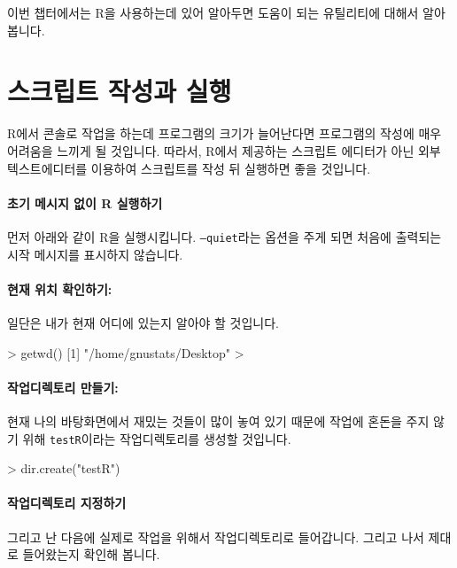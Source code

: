 이번 챕터에서는 R을 사용하는데 있어 알아두면 도움이 되는 유틸리티에 대해서 알아봅니다.


\section{스크립트 작성과 실행}

R에서 콘솔로 작업을 하는데 프로그램의 크기가 늘어난다면 프로그램의 작성에 매우 어려움을 느끼게 될 것입니다.
따라서, R에서 제공하는 스크립트 에디터가 아닌 외부 텍스트에디터를 이용하여 스크립트를 작성 뒤 실행하면 좋을 것입니다.

\paragraph{초기 메시지 없이 R 실행하기}
먼저 아래와 같이 R을 실행시킵니다. 
\texttt{--quiet}라는 옵션을 주게 되면 처음에 출력되는 시작 메시지를 표시하지 않습니다. 

\begin{Schunk}
\end{Schunk}

\paragraph{현재 위치 확인하기:}
일단은 내가 현재 어디에 있는지 알아야 할 것입니다.
\begin{Schunk}
\begin{Soutput}
> getwd()
[1] "/home/gnustats/Desktop"
> 
\end{Soutput}
\end{Schunk}

\paragraph{작업디렉토리 만들기:}
현재 나의 바탕화면에서 재밌는 것들이 많이 놓여 있기 때문에 작업에 혼돈을 주지 않기 위해 \texttt{testR}이라는 작업디렉토리를 생성할 것입니다. 
\begin{Schunk}
\begin{Soutput}
> dir.create("testR")
\end{Soutput}
\end{Schunk}

\paragraph{작업디렉토리 지정하기}
그리고 난 다음에 실제로 작업을 위해서 작업디렉토리로 들어갑니다. 
그리고 나서 제대로 들어왔는지 확인해 봅니다. 

